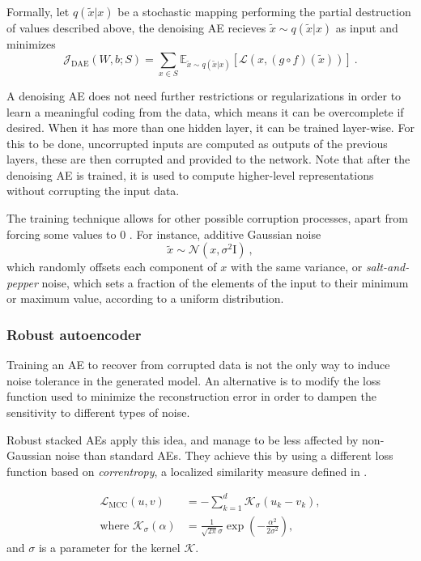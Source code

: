 Formally, let $q(\tilde x\vert x)$ be a stochastic mapping performing the partial destruction of values described above, the denoising AE recieves $\tilde x\sim q(\tilde x\vert x)$ as input and minimizes
\begin{equation}
  \mathcal J_{\mathrm{DAE}}(W,b;S)=\sum_{x\in S}\mathbb E_{\tilde x \sim q(\tilde x \vert x)} \left[\mathcal L(x, (g\circ f)(\tilde x))\right]~.
\end{equation}

A denoising AE does not need further restrictions or regularizations in order to learn a meaningful coding from the data, which means it can be overcomplete if desired. When it has more than one hidden layer, it can be trained layer-wise. For this to be done, uncorrupted inputs are computed as outputs of the previous layers, these are then corrupted and provided to the network. Note that after the denoising AE is trained, it is used to compute higher-level representations without corrupting the input data.

The training technique allows for other possible corruption processes, apart from forcing some values to 0 . For instance, additive Gaussian noise
\begin{equation}
  \tilde x \sim \mathcal N(x, \sigma^2 \mathrm I)~,
\end{equation}
which randomly offsets each component of $x$ with the same variance, or \textit{salt-and-pepper} noise, which sets a fraction of the elements of the input to their minimum or maximum value, according to a uniform distribution.

\subsubsection{Robust autoencoder}

Training an AE to recover from corrupted data is not the only way to induce noise tolerance in the generated model. An alternative is to modify the loss function used to minimize the reconstruction error in order to dampen the sensitivity to different types of noise.

Robust stacked AEs  apply this idea, and manage to be less affected by non-Gaussian noise than standard AEs. They achieve this by using a different loss function based on \textit{correntropy}, a localized similarity measure defined in . 

\begin{align}
  \mathcal L_{\mathrm{MCC}}(u, v)&=-\sum_{k=1}^d\mathcal K_{\sigma}(u_k-v_k),\\\text{where }
  \mathcal K_{\sigma}(\alpha)&=\frac{1}{\sqrt{2\pi}\sigma}\exp\left(-\frac{\alpha^2}{2\sigma^2}\right),
\end{align}
and $\sigma$ is a parameter for the kernel $\mathcal K$.

